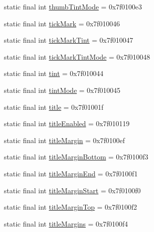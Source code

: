 \begin{CompactItemize}
\item 
static final int \hyperlink{classandroid_1_1support_1_1v7_1_1cardview_1_1_r_1_1attr_c96671e40775a04f6d1c9a2c8e71a368}{thumbTintMode} = 0x7f0100e3
\item 
static final int \hyperlink{classandroid_1_1support_1_1v7_1_1cardview_1_1_r_1_1attr_750a86fb7bf444011fd945896105e108}{tickMark} = 0x7f010046
\item 
static final int \hyperlink{classandroid_1_1support_1_1v7_1_1cardview_1_1_r_1_1attr_cb7b63e6c61f181e5acef651650c69a1}{tickMarkTint} = 0x7f010047
\item 
static final int \hyperlink{classandroid_1_1support_1_1v7_1_1cardview_1_1_r_1_1attr_bcd0eacc0a750ddad15336bbfaa3b6f3}{tickMarkTintMode} = 0x7f010048
\item 
static final int \hyperlink{classandroid_1_1support_1_1v7_1_1cardview_1_1_r_1_1attr_7fec9c6fa032168d8f1456c9ce1792b9}{tint} = 0x7f010044
\item 
static final int \hyperlink{classandroid_1_1support_1_1v7_1_1cardview_1_1_r_1_1attr_20a9de823d3cb08d78dedf4e28abc855}{tintMode} = 0x7f010045
\item 
static final int \hyperlink{classandroid_1_1support_1_1v7_1_1cardview_1_1_r_1_1attr_f959b6cb4cc89b202e0d7168e7c8840b}{title} = 0x7f01001f
\item 
static final int \hyperlink{classandroid_1_1support_1_1v7_1_1cardview_1_1_r_1_1attr_cb4fb938012c76e07c928ff96d806b9c}{titleEnabled} = 0x7f010119
\item 
static final int \hyperlink{classandroid_1_1support_1_1v7_1_1cardview_1_1_r_1_1attr_c7d619d9cac8afca52dd5162eb0c155f}{titleMargin} = 0x7f0100ef
\item 
static final int \hyperlink{classandroid_1_1support_1_1v7_1_1cardview_1_1_r_1_1attr_5f36f313299704afe7d24b42a9a51e8e}{titleMarginBottom} = 0x7f0100f3
\item 
static final int \hyperlink{classandroid_1_1support_1_1v7_1_1cardview_1_1_r_1_1attr_5ca0e9c484123cda7710799dff420628}{titleMarginEnd} = 0x7f0100f1
\item 
static final int \hyperlink{classandroid_1_1support_1_1v7_1_1cardview_1_1_r_1_1attr_81027be51518d3bdb3f708eb5bd96842}{titleMarginStart} = 0x7f0100f0
\item 
static final int \hyperlink{classandroid_1_1support_1_1v7_1_1cardview_1_1_r_1_1attr_4371ab2e0c11769021a8cf641312dedd}{titleMarginTop} = 0x7f0100f2
\item 
static final int \hyperlink{classandroid_1_1support_1_1v7_1_1cardview_1_1_r_1_1attr_a1e50d0424eb5d4424860ff9e480bb33}{titleMargins} = 0x7f0100f4

\end{CompactItemize}
